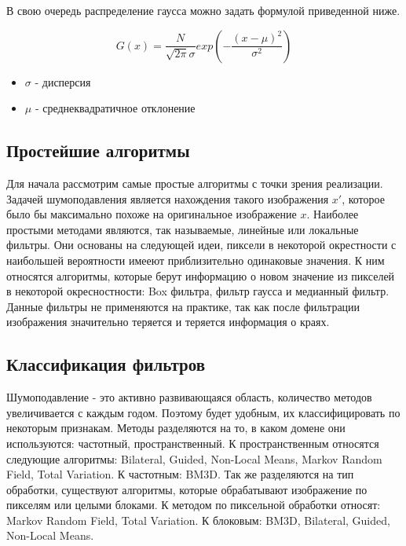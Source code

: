 В свою очередь распределение гаусса можно задать формулой приведенной ниже.

\begin{equation}\label{eGaussNoise}
	G(x)=\frac{N}{\sqrt{2\pi}\sigma}exp(-\frac{(x-\mu)^2}{\sigma^2})	
\end{equation}
\begin{itemize}
	\item $\sigma$ - дисперсия 
	\item $\mu$ - среднеквадратичное отклонение
\end{itemize}


\subsection{Простейшие алгоритмы}
Для начала рассмотрим самые простые алгоритмы с точки зрения реализации.
Задачей шумоподавления является нахождения такого изображения $x'$, которое было бы максимально похоже на оригинальное изображение $x$. 
Наиболее простыми методами являются, так называемые, линейные или локальные фильтры. Они основаны на следующей идеи, пиксели в некоторой окрестности с наибольшей вероятности имееют приблизительно одинаковые значения. К ним относятся алгоритмы, которые берут информацию о новом значение из пикселей в некоторой окресностности: Box фильтра, фильтр гаусса и медианный фильтр. Данные фильтры не применяются на практике, так как после фильтрации изображения значительно теряется и теряется информация о краях.

\subsection{Классификация фильтров}
Шумоподавление - это активно развивающаяся область, количество методов увеличивается с каждым годом. Поэтому будет удобным, их классифицировать по некоторым признакам. Методы разделяются на то, в каком домене они используются: частотный, пространственный.
К пространственным относятся следующие алгоритмы: Bilateral, Guided, Non-Local Means, Markov Random Field, Total Variation.
К частотным: BM3D.
Так же разделяются на тип обработки, существуют алгоритмы, которые обрабатывают изображение по пикселям или целыми блоками.
К методом по пиксельной обработки относят: Markov Random Field, Total Variation.
К блоковым: BM3D, Bilateral, Guided, Non-Local Means.
